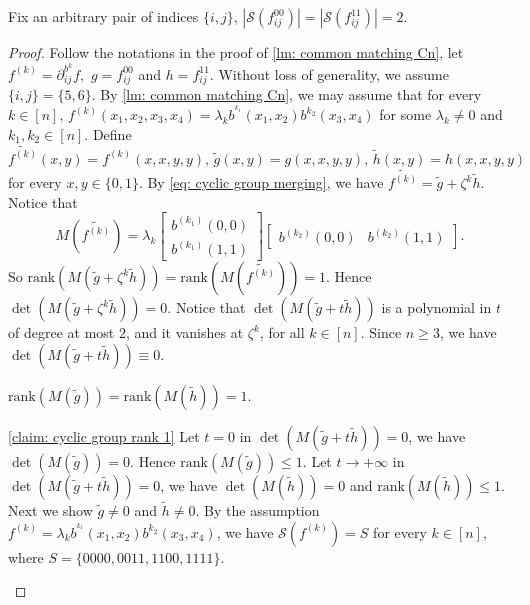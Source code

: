\begin{lemma}\label{lm: cyclic group support size 2}
    Fix an arbitrary pair of indices $\{i,j\}$, $|\mathscr{S}(f_{ij}^{00})|=|\mathscr{S}(f_{ij}^{11})|=2.$ 
\end{lemma}
\begin{proof}
    Follow the notations in the proof of \cref{lm: common matching Cn},
    let $f^{(k)}=\partial_{ij}^{b^k}f,$ $g=f_{ij}^{00}$ and $h=f_{ij}^{11}.$
    Without loss of generality, we assume $\{i,j\}=\{5,6\}$.
    By \cref{lm: common matching Cn}, we may assume that for every $k\in[n]$, $f^{(k)}(x_1,x_2,x_3,x_4)=\lambda_k b^{^{k_1}}(x_1,x_2)b^{k_2}(x_3,x_4)$ for some $\lambda_k\neq 0$ and $k_1,k_2\in [n]$.
    Define $\widetilde{f^{(k)}}(x,y)=f^{(k)}(x,x,y,y),\,\widetilde{g}(x,y)=g(x,x,y,y),\,\widetilde{h}(x,y)=h(x,x,y,y)$ for every $x,y\in \{0,1\}.$
    By \eqref{eq: cyclic group merging}, we have $\widetilde{f^{(k)}}=\widetilde{g}+\zeta^k \widetilde{h}.$
    Notice that $$M(\widetilde{f^{(k)}})=\lambda_k\left[\begin{matrix}
        b^{(k_1)}(0,0)\\
        b^{(k_1)}(1,1)
    \end{matrix}\right]
    \left[\begin{matrix}
        b^{(k_2)}(0,0)&
        b^{(k_2)}(1,1)
    \end{matrix}\right].$$
    So $\mathrm{rank}(M(\widetilde{g}+\zeta^k\widetilde{h}))=\mathrm{rank}(M(\widetilde{f^{(k)}}))=1.$
    Hence $\det(M(\widetilde{g}+\zeta^k\widetilde{h}))=0.$
    Notice that $\det(M(\widetilde{g}+t\widetilde{h}))$ is a polynomial in $t$ of degree at most $2$, and it vanishes at $\zeta^k$, for all $k\in [n]$.
    Since $n\ge 3$, we have $\det(M(\widetilde{g}+t\widetilde{h}))\equiv 0.$
    \begin{claim}\label{claim: cyclic group rank 1}
        $\mathrm{rank}(M(\widetilde{g}))=\mathrm{rank}(M(\widetilde{h}))=1.$
    \end{claim}
    \begin{claimproof}{\cref{claim: cyclic group rank 1}}
        Let $t=0$ in $\det(M(\widetilde{g}+t\widetilde{h}))= 0$, we have $\det(M(\widetilde{g}))=0.$
        Hence $\mathrm{rank}(M(\widetilde{g}))\le 1.$
        Let $t\to +\infty$ in $\det(M(\widetilde{g}+t\widetilde{h}))= 0$, we have $\det(M(\widetilde{h}))=0$ and $\mathrm{rank}(M(\widetilde{h}))\le 1.$
        Next we show $\widetilde{g}\neq 0$ and $\widetilde{h}\ne 0.$
        By the assumption $f^{(k)}=\lambda_k b^{^{k_1}}(x_1,x_2)b^{k_2}(x_3,x_4)$, we have $\mathscr{S}(f^{(k)})=S$ for every $k\in [n]$, where $S=\{0000,0011,1100,1111\}.$

\end{claimproof}
\end{proof}

